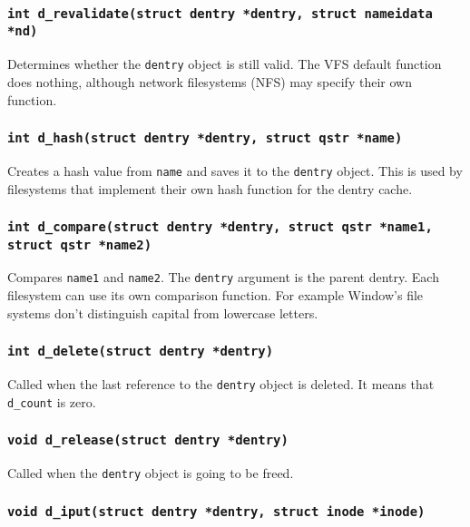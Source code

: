 \subsubsection{\texttt{int d\_revalidate(struct dentry *dentry, struct nameidata *nd)}}

Determines whether the \texttt{dentry} object is still valid. The VFS default
function does nothing, although network filesystems (NFS) may specify their own
function.

\subsubsection{\texttt{int d\_hash(struct dentry *dentry, struct qstr *name)}}

Creates a hash value from \texttt{name} and saves it to the \texttt{dentry} object. This
is used by filesystems that implement their own hash function for the dentry cache.

\subsubsection{\texttt{int d\_compare(struct dentry *dentry, struct qstr *name1,\\struct qstr
*name2)}}

Compares \texttt{name1} and \texttt{name2}. The \texttt{dentry} argument is the parent
dentry. Each filesystem can use its own comparison function. For example Window's file
systems don't distinguish capital from lowercase letters.

\subsubsection{\texttt{int d\_delete(struct dentry *dentry)}}

Called when the last reference to the \texttt{dentry} object is deleted. It means that
\texttt{d\_count} is zero.

\subsubsection{\texttt{void d\_release(struct dentry *dentry)}}

Called when the \texttt{dentry} object is going to be freed.

\subsubsection{\texttt{void d\_iput(struct dentry *dentry, struct inode *inode)}}

